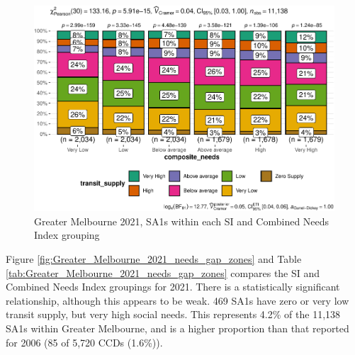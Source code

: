 \documentclass[preprint, 3p,
authoryear]{elsarticle} %
\begin{document}
\begin{figure}
\centering
\includegraphics{Leveraging_GTFS_to_assess_transit_supply_Transport_Geography_files/figure-latex/Greater_Melbourne_2021_needs_gap_zones-1.pdf}
\caption{Greater Melbourne 2021, SA1s within each SI and Combined Needs
Index grouping}
\end{figure}

Figure \ref{fig:Greater_Melbourne_2021_needs_gap_zones} and Table
\ref{tab:Greater_Melbourne_2021_needs_gap_zones} compares the SI and
Combined Needs Index groupings for 2021. There is a statistically
significant relationship, although this appears to be weak. 469 SA1s
have zero or very low transit supply, but very high social needs. This
represents 4.2\% of the 11,138 SA1s within Greater Melbourne, and is a
higher proportion than that reported for 2006 (85 of 5,720 CCDs
(1.6\%)).
\end{document}
